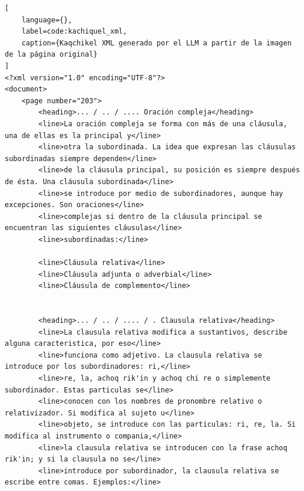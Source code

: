 \begin{lstlisting}[
    language={},
    label=code:kachiquel_xml,
    caption={Kaqchikel XML generado por el LLM a partir de la imagen de la página original}
]
<?xml version="1.0" encoding="UTF-8"?>
<document>
    <page number="203">
        <heading>... / .. / .... Oración compleja</heading>
        <line>La oración compleja se forma con más de una cláusula, una de ellas es la principal y</line>
        <line>otra la subordinada. La idea que expresan las cláusulas subordinadas siempre dependen</line>
        <line>de la cláusula principal, su posición es siempre después de ésta. Una cláusula subordinada</line>
        <line>se introduce por medio de subordinadores, aunque hay excepciones. Son oraciones</line>
        <line>complejas si dentro de la cláusula principal se encuentran las siguientes cláusulas</line>
        <line>subordinadas:</line>
       
        <line>Cláusula relativa</line>
        <line>Cláusula adjunta o adverbial</line>
        <line>Cláusula de complemento</line>


        <heading>... / .. / .... / . Clausula relativa</heading>
        <line>La clausula relativa modifica a sustantivos, describe alguna caracteristica, por eso</line>
        <line>funciona como adjetivo. La clausula relativa se introduce por los subordinadores: ri,</line>
        <line>re, la, achoq rik'in y achoq chi re o simplemente subordinador. Estas particulas se</line>
        <line>conocen con los nombres de pronombre relativo o relativizador. Si modifica al sujeto u</line>
        <line>objeto, se introduce con las particulas: ri, re, la. Si modifica al instrumento o compania,</line>
        <line>la clausula relativa se introducen con la frase achoq rik'in; y si la clausula no se</line>
        <line>introduce por subordinador, la clausula relativa se escribe entre comas. Ejemplos:</line>



\end{lstlisting}
